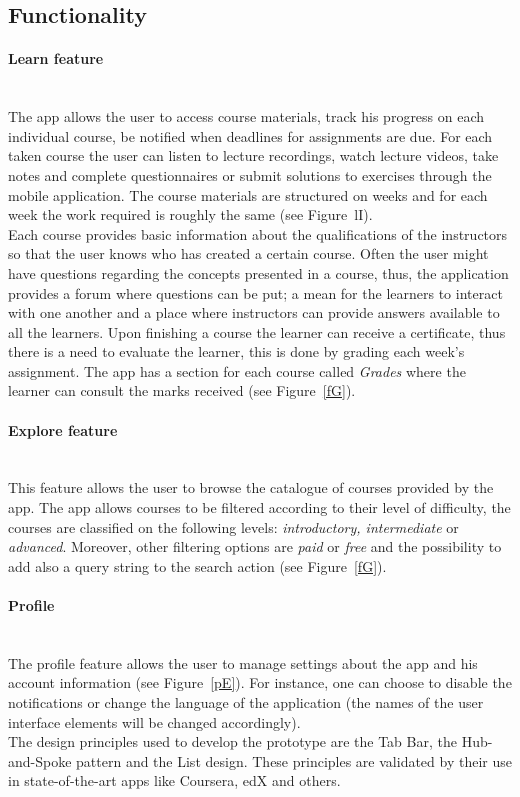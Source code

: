 \documentclass[version=last,fontsize=13pt]{scrartcl}
\newcommand{\myparagraph}[1]{\paragraph{#1}\mbox{}\\}
\begin{document}
	\subsection{Functionality}

	\myparagraph{Learn feature}
	\indent
	The app allows the user to access course materials, track his progress on each individual course, be notified when deadlines for assignments are due. For each taken course the user can listen to lecture recordings, watch lecture videos, take notes and complete questionnaires or submit solutions to exercises through the mobile application. The course materials are structured on weeks and for each week the work required is roughly the same (see Figure~{lI}). \\
	Each course provides basic information about the qualifications of the instructors so that the user knows who has created a certain course. Often the user might have questions regarding the concepts presented in a course, thus, the application provides a forum where questions can be put; a mean for the learners to interact with one another and a place where instructors can provide answers available to all the learners. Upon finishing a course the learner can receive a certificate, thus there is a need to evaluate the learner, this is done by grading each week's assignment. The app has a section for each course called \textit{Grades} where the learner can consult the marks received (see Figure~\ref{fG}). 

	\myparagraph{Explore feature}
	\indent
	This feature allows the user to browse the catalogue of courses provided by the app. The app allows courses to be filtered according to their level of difficulty, the courses are classified on the following levels: \textit{introductory, intermediate} or \textit{advanced}. Moreover, other filtering options are \textit{paid} or \textit{free}  and the possibility to add also a query string to the search action (see Figure~\ref{fG}).	

	\myparagraph{Profile}
	\indent
	The profile feature allows the user to manage settings about the app and his account information (see Figure~\ref{pE}). For instance, one can choose to disable the notifications or change the language of the application (the names of the user interface elements will be changed accordingly).\\

	\indent
	The design principles used to develop the prototype are the Tab Bar, the Hub-and-Spoke pattern and the List design. These principles are validated by their use in state-of-the-art apps like Coursera, edX and others.
\end{document}
